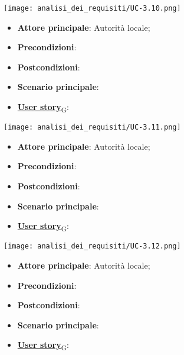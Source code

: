 \begin{center}
	\texttt{[image: analisi\_dei\_requisiti/UC-3.10.png]}
\end{center}
\begin{itemize}
	\item \textbf{Attore principale}: Autorità locale;
	\item \textbf{Precondizioni}:
	\item \textbf{Postcondizioni}:
	\item \textbf{Scenario principale}:
	\item \href{https://7last.github.io/docs/rtb/documentazione-interna/glossario\#user-story}{\textbf{User story}\textsubscript{G}}:
\end{itemize}

\begin{center}
	\texttt{[image: analisi\_dei\_requisiti/UC-3.11.png]}
\end{center}

\begin{itemize}
	\item \textbf{Attore principale}: Autorità locale;
	\item \textbf{Precondizioni}:
	\item \textbf{Postcondizioni}:
	\item \textbf{Scenario principale}:
	\item \href{https://7last.github.io/docs/rtb/documentazione-interna/glossario\#user-story}{\textbf{User story}\textsubscript{G}}:
\end{itemize}

\begin{center}
	\texttt{[image: analisi\_dei\_requisiti/UC-3.12.png]}
\end{center}
\begin{itemize}
	\item \textbf{Attore principale}: Autorità locale;
	\item \textbf{Precondizioni}:
	\item \textbf{Postcondizioni}:
	\item \textbf{Scenario principale}:
	\item \href{https://7last.github.io/docs/rtb/documentazione-interna/glossario\#user-story}{\textbf{User story}\textsubscript{G}}:
\end{itemize}

